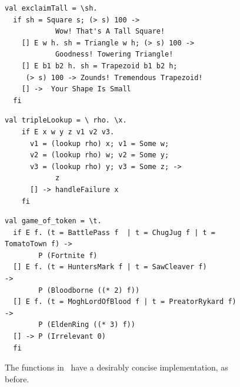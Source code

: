 \documentclass[article,screen,12pt, nonacm]{acmart}
\begin{document}
    
    \begin{figure}[ht] 
      \begin{minipage}[h]{0.54\linewidth}
        \vmlst 
        \begin{lstlisting}[numbers=none, basicstyle=\tiny, xleftmargin=.2em,
          showstringspaces=false,
          frame=single]
val exclaimTall = \sh.
  if sh = Square s; (> s) 100 -> 
            Wow! That's A Tall Square!  
    [] E w h. sh = Triangle w h; (> s) 100 ->
            Goodness! Towering Triangle!
    [] E b1 b2 h. sh = Trapezoid b1 b2 h; 
     (> s) 100 -> Zounds! Tremendous Trapezoid!
    [] ->  Your Shape Is Small
  fi 
  \end{lstlisting}
          \label{fig:vmexclaimtall} 
      \end{minipage}%
      \begin{minipage}[h]{0.5\linewidth}
        \vmlst 
        \begin{lstlisting}[numbers=none, basicstyle=\tiny, xleftmargin=2em,
                      frame=single]
  val tripleLookup = \ rho. \x.
    if E x w y z v1 v2 v3. 
      v1 = (lookup rho) x; v1 = Some w; 
      v2 = (lookup rho) w; v2 = Some y; 
      v3 = (lookup rho) y; v3 = Some z; -> 
            z 
      [] -> handleFailure x
    fi 
   \end{lstlisting}
            \label{fig:vmtriplelookup} 
        \vspace{4ex}
      \end{minipage} 
      \begin{minipage}[h]{\linewidth}
        \vmlst 
        \begin{lstlisting}[numbers=none, basicstyle=\tiny, xleftmargin=9em,
          showstringspaces=false,
          frame=single]
val game_of_token = \t. 
  if E f. (t = BattlePass f  | t = ChugJug f | t = TomatoTown f) -> 
        P (Fortnite f)
  [] E f. (t = HuntersMark f | t = SawCleaver f)                 -> 
        P (Bloodborne ((* 2) f))
  [] E f. (t = MoghLordOfBlood f | t = PreatorRykard f)          -> 
        P (EldenRing ((* 3) f))
  [] -> P (Irrelevant 0)
  fi 
\end{lstlisting}
          \label{fig:vmgot}
      \vspace{4ex}
      \end{minipage}%
      \caption{The functions in \VMinus\ have a desirably concise
      implementation, as before.}
  \label{fig:vminusfuncs}
    \end{figure}   
\end{document}

